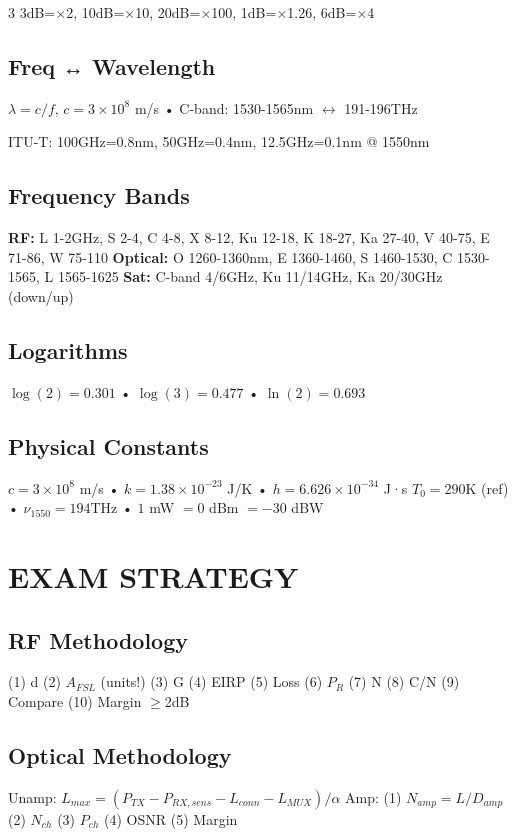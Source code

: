 \documentclass[a4paper,6pt]{extarticle}
\begin{document}
\begin{multicols}{3}
3dB=$\times$2, 10dB=$\times$10, 20dB=$\times$100, 1dB=$\times$1.26, 6dB=$\times$4

\subsection*{Freq ↔ Wavelength}
$\lambda = c/f$, $c = 3 \times 10^8$ m/s • C-band: 1530-1565nm $\leftrightarrow$ 191-196THz

ITU-T: 100GHz=0.8nm, 50GHz=0.4nm, 12.5GHz=0.1nm @ 1550nm

\subsection*{Frequency Bands}
\textbf{RF:} L 1-2GHz, S 2-4, C 4-8, X 8-12, Ku 12-18, K 18-27, Ka 27-40, V 40-75, E 71-86, W 75-110
\textbf{Optical:} O 1260-1360nm, E 1360-1460, S 1460-1530, C 1530-1565, L 1565-1625
\textbf{Sat:} C-band 4/6GHz, Ku 11/14GHz, Ka 20/30GHz (down/up)

\subsection*{Logarithms}
$\log(2) = 0.301$ • $\log(3) = 0.477$ • $\ln(2) = 0.693$

\subsection*{Physical Constants}
$c = 3 \times 10^8$ m/s • $k = 1.38 \times 10^{-23}$ J/K • $h = 6.626 \times 10^{-34}$ J·s
$T_0 = 290$K (ref) • $\nu_{1550} = 194$THz • $1$ mW $= 0$ dBm $= -30$ dBW

\section*{EXAM STRATEGY}

\subsection*{RF Methodology}
(1) d (2) $A_{FSL}$ (units!) (3) G (4) EIRP (5) Loss (6) $P_R$ (7) N (8) C/N (9) Compare (10) Margin $\geq$2dB

\subsection*{Optical Methodology}
Unamp: $L_{max} = (P_{TX}-P_{RX,sens}-L_{conn}-L_{MUX})/\alpha$
Amp: (1) $N_{amp}=L/D_{amp}$ (2) $N_{ch}$ (3) $P_{ch}$ (4) OSNR (5) Margin


\end{multicols}
\end{document}
